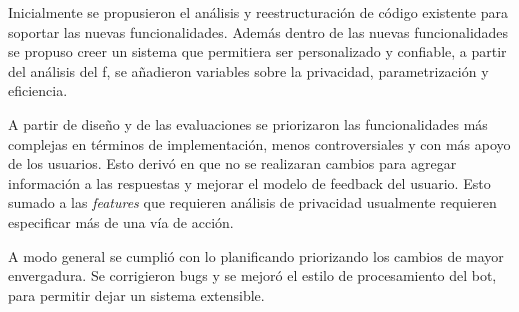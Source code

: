     \par Inicialmente se propusieron el análisis y reestructuración de código existente para soportar las nuevas funcionalidades. Además dentro de las nuevas funcionalidades se propuso creer un sistema que permitiera ser personalizado y confiable, a partir del análisis del \acrlong{f}, se añadieron variables sobre la privacidad, parametrización y eficiencia.
    \par A partir de diseño y de las evaluaciones se priorizaron las funcionalidades más complejas en términos de implementación, menos controversiales y con más apoyo de los usuarios. Esto derivó en que no se realizaran cambios para agregar información a las respuestas y mejorar el modelo de feedback del usuario. Esto sumado a las \textit{features} que requieren análisis de privacidad usualmente requieren especificar más de una vía de acción.
    \par A modo general se cumplió con lo planificando priorizando los cambios de mayor envergadura. Se corrigieron bugs y se mejoró el estilo de procesamiento del bot, para permitir dejar un sistema extensible.